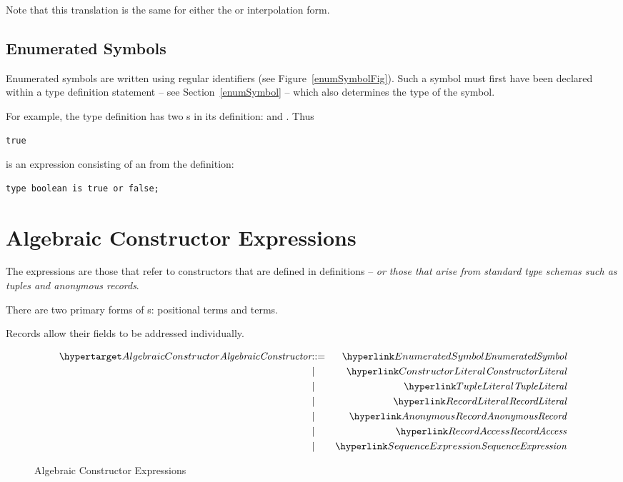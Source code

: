 \begin{aside}
Note that this translation is the same for either the \q{\$} or \q{\#} interpolation form.
\end{aside}


\subsection{Enumerated Symbols}
\label{enumeratedSymbol}
Enumerated symbols are written using regular identifiers (see Figure~\vref{enumSymbolFig}). Such a symbol must first have been declared within a type definition statement -- see Section~\vref{enumSymbol} -- which also determines the type of the symbol.

For example, the  type definition has two s in its definition:  and . Thus
\begin{lstlisting}
true
\end{lstlisting}
is an expression consisting of an  from the definition:
\begin{lstlisting}
type boolean is true or false;
\end{lstlisting}

\section{Algebraic Constructor Expressions}
\label{algebraicConstructors}

The  expressions are those that refer to constructors that are defined in  definitions -- \emph{or those that arise from standard type schemas such as tuples and anonymous records}.

There are two primary forms of s: positional  terms and  terms.

Records allow their fields to be addressed individually.

\begin{figure}[htbp]
\begin{eqnarray*}
\ntDef{AlgebraicConstructor}&\arrow&\ntRef{EnumeratedSymbol}\\
&\choice&\ntRef{ConstructorLiteral}\\
&\choice&\ntRef{TupleLiteral}\\
&\choice&\ntRef{RecordLiteral}\\
&\choice&\ntRef{AnonymousRecord}\\
&\choice&\ntRef{RecordAccess}\\
&\choice&\ntRef{SequenceExpression}
\end{eqnarray*}
\caption{Algebraic Constructor Expressions}
\label{algebraicExpressionFig}
\end{figure}


